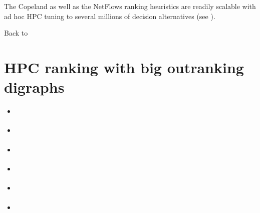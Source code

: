 \documentclass[a4paper,12pt,english]{sphinxhowto}
\begin{document}
The Copeland as well as the NetFlows ranking heuristics are readily scalable with ad hoc HPC tuning to several millions of decision alternatives (see ).

Back to {\hyperref[\detokenize{tutorial:tutorial-label}]{}}


\section{HPC ranking with big outranking digraphs}
\label{\detokenize{tutorial:hpc-ranking-with-big-outranking-digraphs}}\label{\detokenize{tutorial:hpc-tutorial-label}}
\begin{sphinxShadowBox}
\begin{itemize}
\item {} 
\label{\detokenize{tutorial:id199}}{\hyperref[\detokenize{tutorial:c-compiled-python-modules}]{}}

\item {} 
\label{\detokenize{tutorial:id200}}{\hyperref[\detokenize{tutorial:big-data-performance-tableaux}]{}}

\item {} 
\label{\detokenize{tutorial:id201}}{\hyperref[\detokenize{tutorial:c-implemented-integer-valued-outranking-digraphs}]{}}

\item {} 
\label{\detokenize{tutorial:id202}}{\hyperref[\detokenize{tutorial:the-sparse-outranking-digraph-implementation}]{}}

\item {} 
\label{\detokenize{tutorial:id203}}{\hyperref[\detokenize{tutorial:ranking-big-sets-of-decision-alternatives}]{}}

\item {} 
\label{\detokenize{tutorial:id204}}{\hyperref[\detokenize{tutorial:hpc-quantiles-ranking-records}]{}}

\end{itemize}
\end{sphinxShadowBox}
\end{document}
